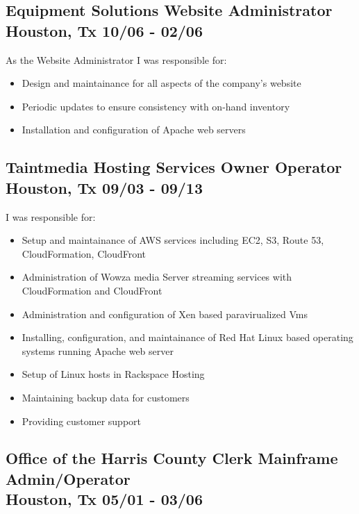\documentclass{article}
\begin{document}
  \subsection{Equipment Solutions \hfill Website Administrator\\
    Houston, Tx \hfill 10/06 - 02/06\\
  }

  As the Website Administrator I was responsible for:\\
  \begin{itemize}
  \item Design and maintainance for all aspects of the company’s website
  \item Periodic updates to ensure consistency with on-hand inventory
  \item Installation and configuration of Apache web servers
  \end{itemize}
  
  \subsection{Taintmedia Hosting Services \hfill Owner Operator\\
    Houston, Tx \hfill 09/03 - 09/13\\
  }

  I was responsible for:\\
  \begin{itemize}
  \item Setup and maintainance of AWS services including EC2, S3, Route 53, CloudFormation, CloudFront
  \item Administration of Wowza media Server streaming services with CloudFormation and CloudFront
  \item Administration and configuration of Xen based paravirualized Vms
  \item Installing, configuration, and maintainance of Red Hat Linux based operating systems running Apache web server
  \item Setup of Linux hosts in Rackspace Hosting
  \item Maintaining backup data for customers
  \item Providing customer support
  \end{itemize}

  \subsection{Office of the Harris County Clerk \hfill Mainframe Admin/Operator\\
    Houston, Tx \hfill 05/01 - 03/06\\
  }
\end{document}
